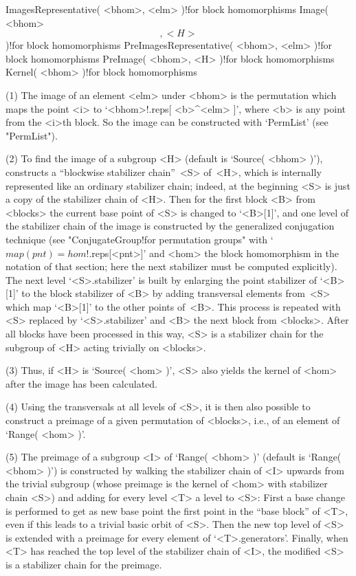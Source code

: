\>ImagesRepresentative( <bhom>, <elm> )!{for block homomorphisms}
\>Image( <bhom> \[, <H> \] )!{for block homomorphisms}
\>PreImagesRepresentative( <bhom>, <elm> )!{for block homomorphisms}
\>PreImage( <bhom>, <H> )!{for block homomorphisms}
\>Kernel( <bhom> )!{for block homomorphisms}

(1) The image of an element  <elm> under <bhom>  is the permutation which
maps the point <i> to `<bhom>!.reps[ <b>^<elm> ]', where <b> is any point
from the <i>th block. So  the image  can  be constructed with  `PermList'
(see "PermList").

(2) To find the image of a subgroup  <H> (default is `Source( <bhom> )'),
{\GAP} constructs a ``blockwise  stabilizer chain''~<S> of~<H>, which  is
internally represented like an ordinary  stabilizer chain; indeed, at the
beginning <S> is just a copy of the stabilizer chain of <H>. Then for the
first block <B> from <blocks> the current base point of <S> is changed to
`<B>[1]',  and one   level of  the  stabilizer  chain   of  the image  is
constructed  by      the    generalized conjugation     technique    (see
"ConjugateGroup!for  permutation     groups"   with      `$map(pnt)     =
hom$!.reps[<pnt>]' and <hom> the block  homomorphism  in the notation  of
that section; here the next  stabilizer must be computed explicitly). The
next level `<S>.stabilizer' is built by enlarging the point stabilizer of
`<B>[1]' to the  block stabilizer of <B>  by adding  transversal elements
from~<S> which  map `<B>[1]' to the  other points of~<B>. This process is
repeated  with <S>  replaced by  `<S>.stabilizer'  and <B> the next block
from <blocks>. After all blocks have been processed in this way, <S> is a
stabilizer chain for the subgroup of <H> acting trivially on <blocks>.

(3) Thus, if  <H> is `Source(  <hom>  )', <S>  also yields  the kernel of
<hom> after the image has been calculated.

(4) Using the transversals at all levels of <S>, it is then also possible
to construct a preimage  of a given permutation  of <blocks>, i.e., of an
element of `Range( <hom> )'.

(5) The preimage   of a subgroup <I>  of  `Range( <bhom> )'  (default  is
`Range( <bhom> )') is constructed by walking  the stabilizer chain of <I>
upwards from the trivial subgroup (whose preimage  is the kernel of <hom>
with stabilizer chain <S>) and adding for every level <T> a level to <S>:
First a base change is performed to get as new base point the first point
in the ``base block'' of <T>, even if this leads to a trivial basic orbit
of  <S>. Then the new top  level of <S> is extended  with  a preimage for
every element of `<T>.generators'. Finally, when  <T> has reached the top
level of the stabilizer  chain of <I>,  the modified <S> is a  stabilizer
chain for the preimage.

